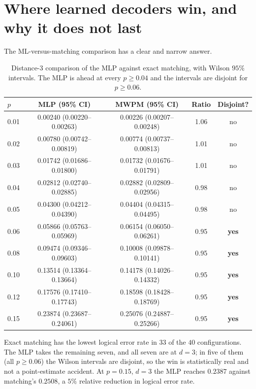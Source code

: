 \documentclass[Thesis.tex]{subfiles}
\begin{document}
\section{Where learned decoders win, and why it does not last}
\label{sec:ch6_mlwin}

The ML-versus-matching comparison has a clear and narrow answer.

\begin{table}[htbp]
\centering
\caption[Distance-3 comparison of the MLP against exact matching]{Distance-3 comparison of the MLP against exact matching, with Wilson $95\%$
intervals. The MLP is ahead at every $p \geq 0.04$ and the intervals are disjoint for
$p \geq 0.06$.}
\label{tab:ch6_d3}
\small
\begin{tabular}{lcccc}
\toprule
\textbf{$p$} & \textbf{MLP (95\% CI)} & \textbf{MWPM (95\% CI)}
& \textbf{Ratio} & \textbf{Disjoint?} \\
\midrule
0.01 & 0.00240 (0.00220--0.00263) & 0.00226 (0.00207--0.00248) & 1.06 & no \\
0.02 & 0.00780 (0.00742--0.00819) & 0.00774 (0.00737--0.00813) & 1.01 & no \\
0.03 & 0.01742 (0.01686--0.01800) & 0.01732 (0.01676--0.01791) & 1.01 & no \\
0.04 & 0.02812 (0.02740--0.02885) & 0.02882 (0.02809--0.02956) & 0.98 & no \\
0.05 & 0.04300 (0.04212--0.04390) & 0.04404 (0.04315--0.04495) & 0.98 & no \\
0.06 & 0.05866 (0.05763--0.05969) & 0.06154 (0.06050--0.06261) & 0.95 & \textbf{yes} \\
0.08 & 0.09474 (0.09346--0.09603) & 0.10008 (0.09878--0.10141) & 0.95 & \textbf{yes} \\
0.10 & 0.13514 (0.13364--0.13664) & 0.14178 (0.14026--0.14332) & 0.95 & \textbf{yes} \\
0.12 & 0.17576 (0.17410--0.17743) & 0.18598 (0.18428--0.18769) & 0.95 & \textbf{yes} \\
0.15 & 0.23874 (0.23687--0.24061) & 0.25076 (0.24887--0.25266) & 0.95 & \textbf{yes} \\
\bottomrule
\end{tabular}
\end{table}

Exact matching has the lowest logical error rate in $33$ of the $40$ configurations.
The MLP takes the remaining seven, and all seven are at $d = 3$; in five of them
(all $p \geq 0.06$) the Wilson intervals are disjoint, so the win is statistically
real and not a point-estimate accident. At $p = 0.15$, $d = 3$ the MLP reaches
$0.2387$ against matching's $0.2508$, a $5\%$ relative reduction in logical error
rate.
\end{document}
